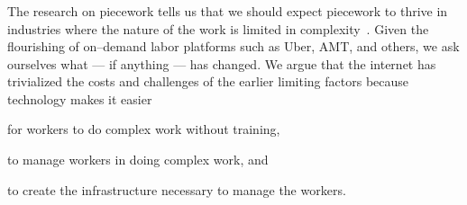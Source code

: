 \documentclass[trackingWork]{subfiles}
\begin{document}
\subsubsection{\whatchanged}
\begin{comment}
  mangeerial overhead limits, so what's different
  more people can now do complex work without training (more complex)
  parts of management can be automated (more firms)
  cheaper to create the infrastructure (more complex)
\end{comment}

The research on piecework tells us that
we should expect piecework to thrive in industries where
the nature of the work is limited in complexity~\cite{Brown01041990}.
Given the flourishing of on--demand labor platforms such as
Uber, AMT, and others, we ask ourselves
what --- if anything --- has changed.
We argue that
the internet has trivialized
the costs and challenges of the earlier limiting factors
because technology makes it easier
\begin{inlinelist}
\item for workers to do complex work without training,
\item to manage workers in doing complex work, and 
\item to create the infrastructure necessary to manage the workers.
\end{inlinelist}
\end{document}
